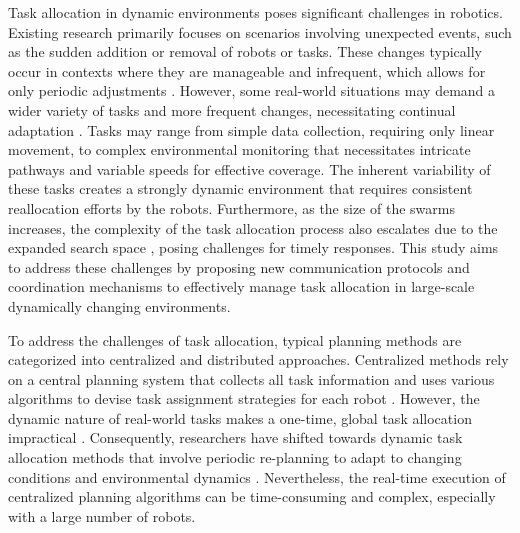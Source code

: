 \documentclass[lettersize,journal]{IEEEtran}
\begin{document}
Task allocation in dynamic environments poses significant challenges in robotics. Existing research primarily focuses on scenarios involving unexpected events, such as the sudden addition or removal of robots or tasks. These changes typically occur in contexts where they are manageable and infrequent, which allows for only periodic adjustments \cite{liu2024distributed,zhang2020dynamic}. However, some real-world situations may demand a wider variety of tasks and more frequent changes, necessitating continual adaptation \cite{peng2021review}. Tasks may range from simple data collection, requiring only linear movement, to complex environmental monitoring that necessitates intricate pathways and variable speeds for effective coverage. The inherent variability of these tasks creates a strongly dynamic environment that requires consistent reallocation efforts by the robots. Furthermore, as the size of the swarms increases, the complexity of the task allocation process also escalates due to the expanded search space \cite{khamis2015multi}, posing challenges for timely responses. This study aims to address these challenges by proposing new communication protocols and coordination mechanisms to effectively manage task allocation in large-scale dynamically changing environments.

 
To address the challenges of task allocation, typical planning methods are categorized into centralized and distributed approaches. Centralized methods rely on a central planning system that collects all task information and uses various algorithms to devise task assignment strategies for each robot \cite{wang2012optimal,an2013simultaneous,issac2019investigations}. However, the dynamic nature of real-world tasks makes a one-time, global task allocation impractical \cite{stirling2001conditional}. Consequently, researchers have shifted towards dynamic task allocation methods that involve periodic re-planning to adapt to changing conditions and environmental dynamics \cite{lopez2019solutions,amorim2020assessing}. Nevertheless, the real-time execution of centralized planning algorithms can be time-consuming and complex, especially with a large number of robots.
\end{document}
